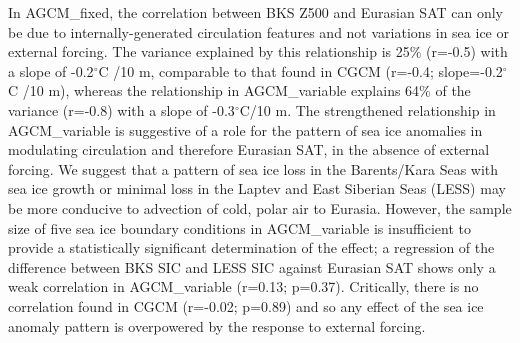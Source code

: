 \documentclass{nature}
\begin{document}

In AGCM\_fixed, the correlation between BKS Z500 and Eurasian SAT can only be due to internally-generated circulation features and not variations in sea ice or external forcing. The variance explained by this relationship is 25\% (r=-0.5) with a slope of -0.2$^\circ$C /10 m, comparable to that found in CGCM (r=-0.4; slope=-0.2$^\circ$C /10 m), whereas the relationship in AGCM\_variable explains 64\% of the variance (r=-0.8) with a slope of -0.3$^\circ$C/10 m. The strengthened relationship in AGCM\_variable is suggestive of a role for the pattern of sea ice anomalies in modulating circulation and therefore Eurasian SAT, in the absence of external forcing. We suggest that a pattern of sea ice loss in the Barents/Kara Seas with sea ice growth or minimal loss in the Laptev and East Siberian Seas (LESS) may be more conducive to advection of cold, polar air to Eurasia. However, the sample size of five sea ice boundary conditions in AGCM\_variable is insufficient to provide a statistically significant determination of the effect; a regression of the difference between BKS SIC and LESS SIC against Eurasian SAT shows only a weak correlation in AGCM\_variable (r=0.13; p=0.37). Critically, there is no correlation found in CGCM (r=-0.02; p=0.89) and so any effect of the sea ice anomaly pattern is overpowered by the response to external forcing.  %
\end{document}
